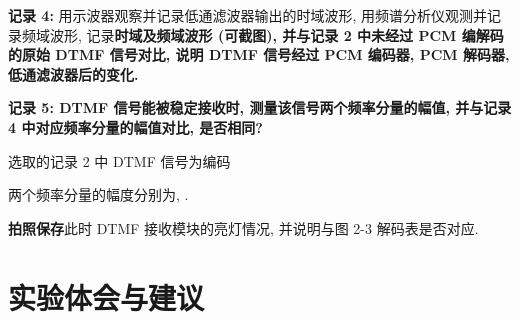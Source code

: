 \documentclass{dspreport}
\begin{document}
\begin{figure}[H]
    \centering
\end{figure}

\begin{block}

\end{block}

\textbf{记录 4:} 用示波器观察并记录低通滤波器输出的时域波形, 用频谱分析仪观测并记录频域波形, 记录\textbf{时域及频域波形 (可截图), 并与记录 2 中未经过 PCM 编解码的原始 DTMF 信号对比, 说明 DTMF 信号经过 PCM 编码器, PCM 解码器, 低通滤波器后的变化.}

\textbf{记录 5: DTMF 信号能被稳定接收时, 测量该信号两个频率分量的幅值, 并与记录 4 中对应频率分量的幅值对比, 是否相同?}

选取的记录 2 中 DTMF 信号为编码\underline{\blank{  }}

两个频率分量的幅度分别为\underline{\blank{  }}, \underline{\blank{  }}.

\textbf{拍照保存}此时 DTMF 接收模块的亮灯情况, 并说明与图 2-3 解码表是否对应.
\begin{block}

\end{block}

\begin{figure}[H]
    \centering
\end{figure}

\begin{block}

\end{block}

\section{实验体会与建议}
\begin{block}

\end{block}
\end{document}
